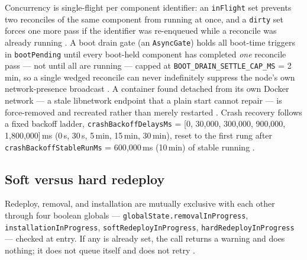 Concurrency is single-flight per component identifier: an \texttt{inFlight} set prevents two
reconciles of the same component from running at once, and a \texttt{dirty} set forces one more
pass if the identifier was re-enqueued while a reconcile was already running
. A boot drain gate (an
\texttt{AsyncGate}) holds all boot-time triggers in \texttt{bootPending} until every boot-held
component has completed \emph{one} reconcile pass — not until all are running — capped at
\texttt{BOOT\_DRAIN\_SETTLE\_CAP\_MS} = 2\,min, so a single wedged reconcile can never indefinitely
suppress the node's own network-presence broadcast
. A container found
detached from its own Docker network — a stale libnetwork endpoint that a plain start cannot repair
— is force-removed and recreated rather than merely restarted
. Crash recovery follows a
fixed backoff ladder, \texttt{crash\allowbreak{}Backoff\allowbreak{}Delays\allowbreak{}Ms} = [0, 30{,}000, 300{,}000, 900{,}000,
1{,}800{,}000]\,ms (0\,s, 30\,s, 5\,min, 15\,min, 30\,min), reset to the first rung after
\texttt{crash\allowbreak{}Backoff\allowbreak{}Stable\allowbreak{}Run\allowbreak{}Ms} = 600{,}000\,ms (10\,min) of stable running
.

\subsection{Soft versus hard redeploy}
\label{sec:fluxos-redeploy}

Redeploy, removal, and installation are mutually exclusive with each other through four boolean
globals — \texttt{globalState.\allowbreak{}removalInProgress}, \texttt{installation\allowbreak{}In\allowbreak{}Progress},
\texttt{soft\allowbreak{}Redeploy\allowbreak{}In\allowbreak{}Progress}, \texttt{hard\allowbreak{}Redeploy\allowbreak{}In\allowbreak{}Progress} — checked at entry. If any is
already set, the call returns a warning and does nothing; it does not queue itself and does not
retry .

